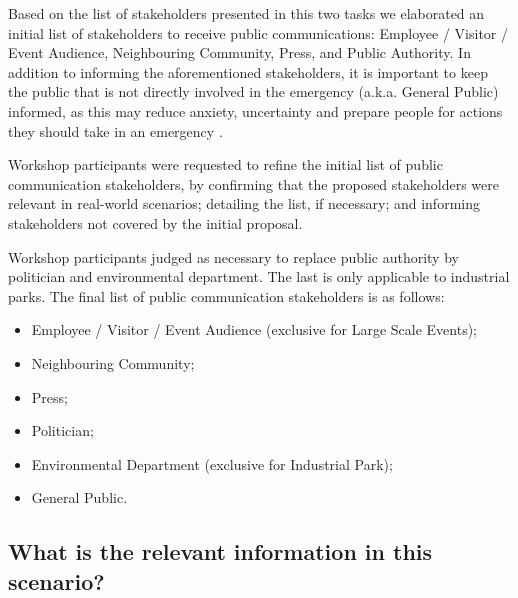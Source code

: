 Based on the list of stakeholders presented in this two tasks we elaborated an initial list of stakeholders to receive public communications: Employee / Visitor / Event Audience, Neighbouring Community, Press, and Public Authority. In addition to informing the aforementioned stakeholders, it is important to keep the public that is not directly involved in the emergency (a.k.a. General Public) informed, as this may reduce anxiety, uncertainty and prepare people for actions they should take in an emergency \citep{cdc2014}.

Workshop participants were requested to refine the initial list of public communication stakeholders, by confirming that the proposed stakeholders were relevant in real-world scenarios; detailing the list, if necessary; and informing stakeholders not covered by the initial proposal.

Workshop participants judged as necessary to replace public authority by politician and environmental department. The last is only applicable to industrial parks. The final list of public communication stakeholders is as follows:


\begin{itemize}
   \item Employee / Visitor / Event Audience (exclusive for Large Scale Events);
   \item Neighbouring Community;
   \item Press;
   \item Politician;
   \item Environmental Department (exclusive for Industrial Park);
   \item General Public.
        
 \end{itemize}


\subsection*{What is the relevant information in this scenario?}



